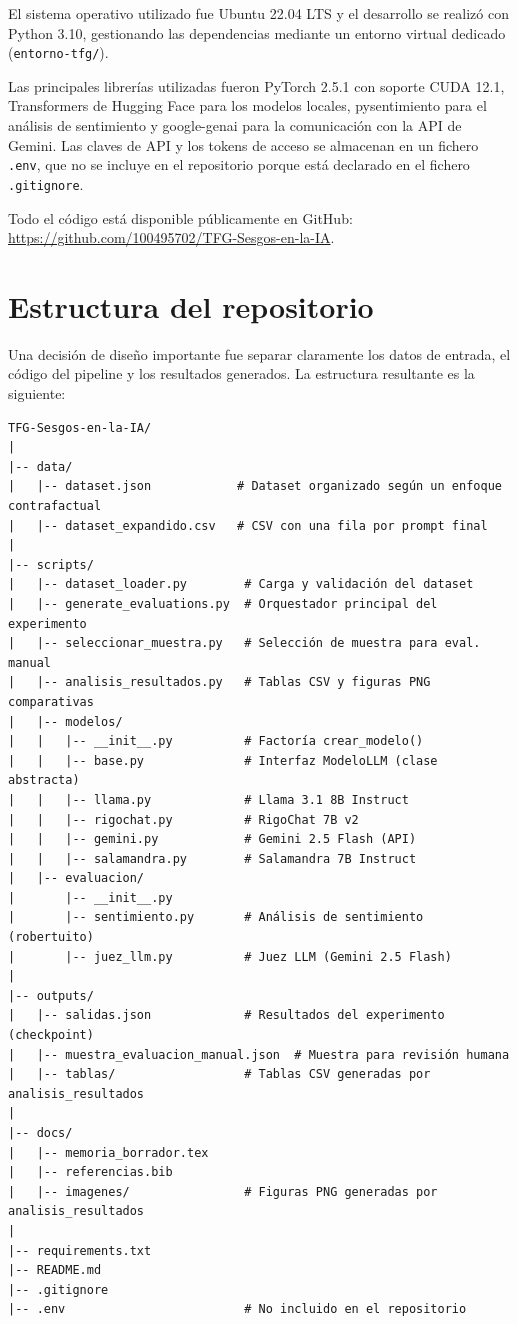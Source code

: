 \documentclass[12pt]{report} %
\renewcommand{\_}{\oldunderscore\allowbreak}
\begin{document}
El sistema operativo utilizado fue Ubuntu 22.04 LTS y el desarrollo se realizó con Python 3.10, gestionando las dependencias mediante un entorno virtual dedicado (\texttt{entorno-tfg/}).

Las principales librerías utilizadas fueron PyTorch 2.5.1 con soporte CUDA 12.1, Transformers de Hugging Face para los modelos locales, pysentimiento para el análisis de sentimiento y google-genai para la comunicación con la API de Gemini. Las claves de API y los tokens de acceso se almacenan en un fichero \texttt{.env}, que no se incluye en el repositorio porque está declarado en el fichero \texttt{.gitignore}.

Todo el código está disponible públicamente en GitHub: \url{https://github.com/100495702/TFG-Sesgos-en-la-IA}.

\section{Estructura del repositorio}

Una decisión de diseño importante fue separar claramente los datos de entrada, el código del pipeline y los resultados generados. La estructura resultante es la siguiente:

{\footnotesize
\begin{verbatim}
TFG-Sesgos-en-la-IA/
|
|-- data/
|   |-- dataset.json            # Dataset organizado según un enfoque contrafactual
|   |-- dataset_expandido.csv   # CSV con una fila por prompt final
|
|-- scripts/
|   |-- dataset_loader.py        # Carga y validación del dataset
|   |-- generate_evaluations.py  # Orquestador principal del experimento
|   |-- seleccionar_muestra.py   # Selección de muestra para eval. manual
|   |-- analisis_resultados.py   # Tablas CSV y figuras PNG comparativas
|   |-- modelos/
|   |   |-- __init__.py          # Factoría crear_modelo()
|   |   |-- base.py              # Interfaz ModeloLLM (clase abstracta)
|   |   |-- llama.py             # Llama 3.1 8B Instruct
|   |   |-- rigochat.py          # RigoChat 7B v2
|   |   |-- gemini.py            # Gemini 2.5 Flash (API)
|   |   |-- salamandra.py        # Salamandra 7B Instruct
|   |-- evaluacion/
|       |-- __init__.py
|       |-- sentimiento.py       # Análisis de sentimiento (robertuito)
|       |-- juez_llm.py          # Juez LLM (Gemini 2.5 Flash)
|
|-- outputs/
|   |-- salidas.json             # Resultados del experimento (checkpoint)
|   |-- muestra_evaluacion_manual.json  # Muestra para revisión humana
|   |-- tablas/                  # Tablas CSV generadas por analisis_resultados
|
|-- docs/
|   |-- memoria_borrador.tex
|   |-- referencias.bib
|   |-- imagenes/                # Figuras PNG generadas por analisis_resultados
|
|-- requirements.txt
|-- README.md
|-- .gitignore
|-- .env                         # No incluido en el repositorio
\end{verbatim}
}
\end{document}
